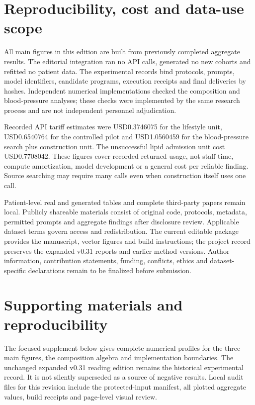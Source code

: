 \documentclass[11pt,letterpaper]{article}
\begin{document}

\section{Reproducibility, cost and data-use scope}

All main figures in this edition are built from previously completed aggregate results. The editorial integration ran no API calls, generated no new cohorts and refitted no patient data. The experimental records bind protocols, prompts, model identifiers, candidate programs, execution receipts and final deliveries by hashes. Independent numerical implementations checked the composition and blood-pressure analyses; these checks were implemented by the same research process and are not independent personnel adjudication.


Recorded API tariff estimates were USD0.3746075 for the lifestyle unit, USD0.6540764 for the controlled pilot and USD1.0560459 for the blood-pressure search plus construction unit. The unsuccessful lipid admission unit cost USD0.7708042. These figures cover recorded returned usage, not staff time, compute amortization, model development or a general cost per reliable finding. Source searching may require many calls even when construction itself uses one call.


Patient-level real and generated tables and complete third-party papers remain local. Publicly shareable materials consist of original code, protocols, metadata, permitted prompts and aggregate findings after disclosure review. Applicable dataset terms govern access and redistribution. The current editable package provides the manuscript, vector figures and build instructions; the project record preserves the expanded v0.31 reports and earlier method versions. Author information, contribution statements, funding, conflicts, ethics and dataset-specific declarations remain to be finalized before submission.


\section*{Supporting materials and reproducibility}

The focused supplement below gives complete numerical profiles for the three main figures, the composition algebra and implementation boundaries. The unchanged expanded v0.31 reading edition remains the historical experimental record. It is not silently superseded as a source of negative results. Local audit files for this revision include the protected-input manifest, all plotted aggregate values, build receipts and page-level visual review.
\end{document}
